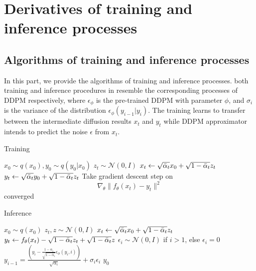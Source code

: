 \setcounter{theorem}{0}
\setcounter{lemma}{0}

\appendices


\section{Derivatives of training and inference processes}

\subsection{Algorithms of training and inference processes}

In this part, we provide the algorithms of training and inference processes.
%
 both training and inference procedures in  resemble the corresponding processes of DDPM respectively, where $\epsilon_{\phi}$ is the pre-trained DDPM with parameter $\phi$, and $\sigma_i$ is the variance of the distribution $\epsilon_{\phi}(y_{i-1}|y_i)$.
%
The training learns to transfer between the intermediate diffusion results $x_t$ and $y_t$ while DDPM approximator intends to predict the noise $\epsilon$ from $x_t$.


\begin{algorithm}[H]
\caption{Training}\label{alg:paired_train}
\begin{algorithmic}[1]
\Repeat
\State $x_0\sim q(x_0),y_0\sim q(y_0|x_0)$
\State $z_t\sim\mathcal N(0, I)$
\State $x_t\leftarrow \sqrt{\bar{\alpha}_{t}}x_0+\sqrt{1-\bar{\alpha}_{t}}z_t$
\State $y_t\leftarrow \sqrt{\bar{\alpha}_{t}}y_0+\sqrt{1-\bar{\alpha}_{t}}z_t$
\State Take gradient descent step on
$$\nabla_{\theta}\|f_{\theta}(x_t)-y_t\|^2$$
\Until converged
\end{algorithmic}
\end{algorithm}


\begin{algorithm}[H]
\caption{Inference}\label{alg:paired_infer}
\begin{algorithmic}[1]
\State $x_0\sim q(x_0)$
\State $z_t,z\sim\mathcal N(0, I)$
\State $x_t\leftarrow \sqrt{\bar{\alpha}_{t}}x_0+\sqrt{1-\bar{\alpha}_{t}}z_t$
\State $y_t\leftarrow f_{\theta}(x_t)-\sqrt{1-\bar{\alpha}_{t}}z_t+\sqrt{1-\bar{\alpha}_{t}}z$
\State $\epsilon_i\sim\mathcal N(0, I)$ if $i>1$, else $\epsilon_i=0$
\State $y_{i-1}=\frac{(y_i-\frac{1-\alpha_i}{\sqrt{1-\bar\alpha_i}}\epsilon_{\phi}(y_i,i))}{\sqrt{\alpha_i}}+\sigma_i\epsilon_i$
\EndFor
\State \Return $y_0$
\end{algorithmic}
\end{algorithm}

